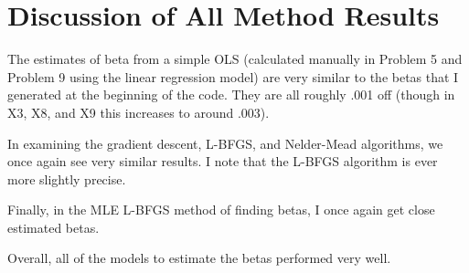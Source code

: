 \documentclass{article}
\begin{document}
\section{Discussion of All Method Results}

The estimates of beta from a simple OLS (calculated manually in Problem 5 and Problem 9 using the linear regression model) are very similar to the betas that I generated at the beginning of the code. They are all roughly .001 off (though in X3, X8, and X9 this increases to around .003). 

In examining the gradient descent, L-BFGS, and Nelder-Mead algorithms, we once again see very similar results. I note that the L-BFGS algorithm is ever more slightly precise. 

Finally, in the MLE L-BFGS method of finding betas, I once again get close estimated betas. 

Overall, all of the models to estimate the betas performed very well.
\end{document}
